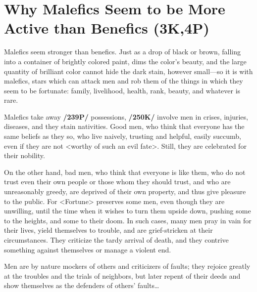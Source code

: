 \section{Why Malefics Seem to be More Active than Benefics (3K,4P)}

Malefics seem stronger than benefics. Just as a drop of black or brown, falling into a container of brightly colored paint, dims the color’s beauty, and the large quantity of brilliant color cannot hide the dark stain, however small—so it is with malefics, stars which can attack men and rob them of the things in which they seem to be fortunate: family, livelihood, health, rank, beauty, and whatever is rare. 

Malefics  take away \textbf{/239P/} possessions, \textbf{/250K/} involve men in crises, injuries, diseases, and they stain nativities. Good men, who think that everyone has the same beliefs as they so, who live naively, trusting and helpful, easily succumb, even if they are not <worthy of such an evil fate>. Still, they are celebrated for their
nobility. 

On the other hand, bad men, who think that everyone is like them, who do not trust even their own people or those whom they should trust, and who are unreasonably greedy, are deprived of their own property, and thus give pleasure to the public. For <Fortune> preserves some men, even though they are unwilling, until the time when it wishes to turn them upside down, pushing some to the heights, and some to their doom. In such cases, many men pray in vain for their lives, yield themselves to trouble, and are grief-stricken at their circumstances. They criticize the tardy arrival of death, and they contrive something against themselves or manage a violent end. 


Men are by nature mockers of others and criticizers of faults; they rejoice greatly at the troubles and the trials of neighbors, but later repent of their deeds and show themselves as the defenders of others’ faults…

